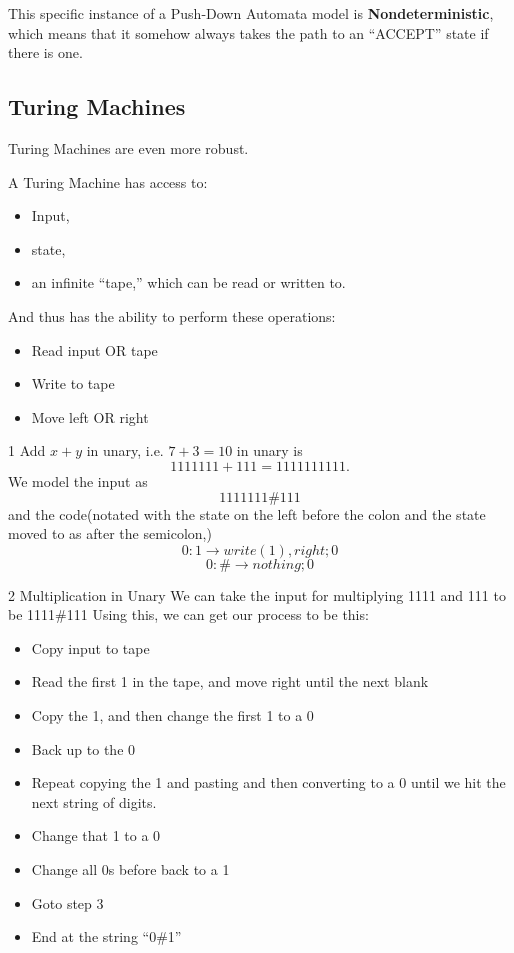 This speciﬁc instance of a Push-Down Automata model is \textbf{Nondeterministic},
 which means that it somehow always takes the path to an “ACCEPT”
state if there is one.

\subsection{Turing Machines}
Turing Machines are even more robust.
\begin{definition}
    A Turing Machine has access to:
    \begin{itemize}
        \item Input, 
        \item state, 
        \item an inﬁnite ``tape,'' which can be read or written to.
    \end{itemize}
    And thus has the ability to perform these operations:
    \begin{itemize}
        \item  Read input OR tape
        \item Write to tape
        \item Move left OR right
    \end{itemize}
\end{definition}

\begin{example}1
    Add $x + y$ in unary, i.e. $7 + 3 = 10$ in unary is
$$1111111 + 111 = 1111111111.$$
We model the input as
$$1111111\#111$$
and the code(notated with the state on the left before the colon and the state moved
to as after the semicolon,)
$$0 : 1 \to write(1), right; 0 $$
$$0 : \# \to nothing; 0$$
\end{example}

\begin{example}2
    Multiplication in Unary
We can take the input for multiplying 1111 and 111 to be 1111\#111 Using
this, we can get our process to be this:
\begin{itemize}
    \item Copy input to tape
    \item Read the ﬁrst 1 in the tape, and move right until the next blank
    \item Copy the 1, and then change the ﬁrst 1 to a 0
    \item Back up to the 0
    \item Repeat copying the 1 and pasting and then converting to a 0 until we
    hit the next string of digits.
    \item Change that 1 to a 0
    \item Change all 0s before back to a 1
    \item Goto step 3
    \item End at the string ``0\#1''
\end{itemize}
\end{example}

